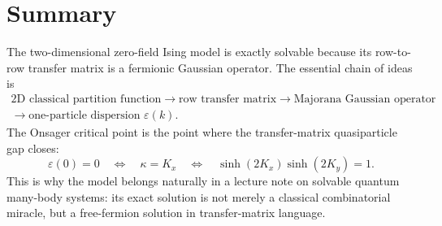 \section{Summary}
\label{sec:2d-classical-ising-summary}

The two-dimensional zero-field Ising model is exactly solvable because its
row-to-row transfer matrix is a fermionic Gaussian operator.  The essential chain
of ideas is
\begin{equation}
\label{eq:2d-classical-ising-solution-chain}
\begin{gathered}
    \text{2D classical partition function}
    \longrightarrow
    \text{row transfer matrix}
    \longrightarrow
    \text{Majorana Gaussian operator}
    \\
    \longrightarrow
    \text{one-particle dispersion }\varepsilon(k).
\end{gathered}
\end{equation}
The Onsager critical point is the point where the transfer-matrix quasiparticle
gap closes:
\begin{equation}
    \varepsilon(0)=0
    \quad\Longleftrightarrow\quad
    \kappa=K_x
    \quad\Longleftrightarrow\quad
    \sinh(2K_x)\sinh(2K_y)=1 .
\end{equation}
This is why the model belongs naturally in a lecture note on solvable quantum
many-body systems: its exact solution is not merely a classical combinatorial
miracle, but a free-fermion solution in transfer-matrix language.

